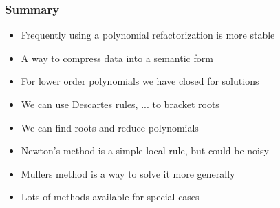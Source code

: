 \documentclass[10pt]{beamer}
\begin{document}
\begin{frame}
  \frametitle{Summary}
  \begin{itemize}
  \item Frequently using a polynomial refactorization is more stable
  \item A way to compress data into a semantic form
  \item For lower order polynomials we have closed for solutions
  \item We can use Descartes rules, ... to bracket roots
  \item We can find roots and reduce polynomials
  \item Newton's method is a simple local rule, but could be noisy
  \item Mullers method is a way to solve it more generally 
  \item Lots of methods available for special cases
  \end{itemize}
\end{frame}
\end{document}
